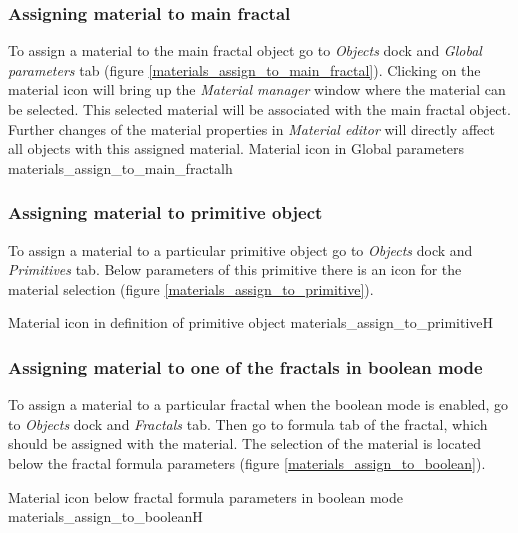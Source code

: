 \subsubsection{Assigning material to main fractal}\label{assigning-material-to-main-fractal}

To assign a material to the main fractal object go to \emph{Objects} dock and \emph{Global parameters} tab (figure \ref{materials_assign_to_main_fractal}). Clicking on the material icon will bring up the \emph{Material manager} window where the material can be selected. This selected material will be associated with the main fractal object. Further changes of the material properties in \emph{Material editor} will directly affect all objects with this assigned material.
\nopagebreak
{}
{Material icon in Global parameters}
{materials_assign_to_main_fractal}{h}

\subsubsection{Assigning material to primitive object}\label{assigning-material-to-primitive}

To assign a material to a particular primitive object go to \emph{Objects} dock and \emph{Primitives} tab. Below parameters of this primitive there is an icon for the material selection (figure \ref{materials_assign_to_primitive}).
 
\nopagebreak
{}
{Material icon in definition of primitive object}
{materials_assign_to_primitive}{H}

\subsubsection{Assigning material to one of the fractals in boolean mode}\label{assigning-material-to-boolean}

To assign a material to a particular fractal when the boolean mode is enabled, go to \emph{Objects} dock and \emph{Fractals} tab. Then go to formula tab of the fractal, which should be assigned with the material. The selection of the material is located below the fractal formula parameters (figure \ref{materials_assign_to_boolean}).

\nopagebreak
{}
{Material icon below fractal formula parameters in boolean mode}
{materials_assign_to_boolean}{H}

